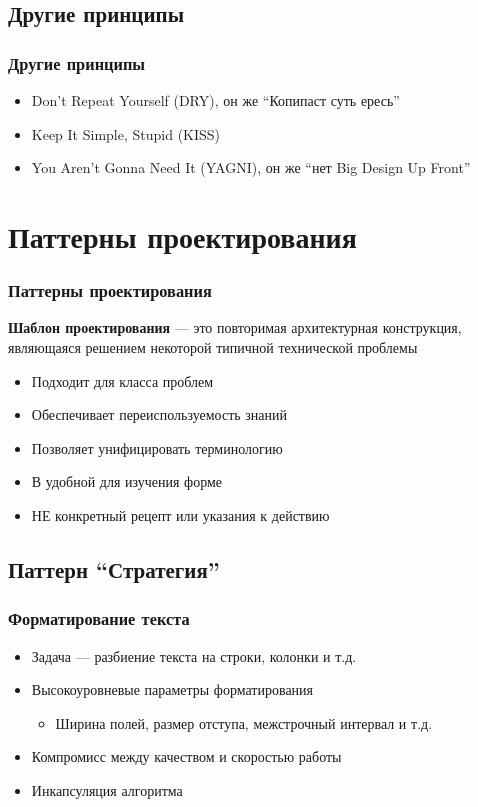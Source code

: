 \documentclass{../../slides-style}
\begin{document}
    \subsection{Другие принципы}

    \begin{frame}
        \frametitle{Другие принципы}
        \begin{itemize}
            \item Don't Repeat Yourself (DRY), он же \enquote{Копипаст суть ересь}
            \item Keep It Simple, Stupid (KISS)
            \item You Aren't Gonna Need It (YAGNI), он же \enquote{нет Big Design Up Front}
        \end{itemize}
    \end{frame}

    \section{Паттерны проектирования}

    \begin{frame}
        \frametitle{Паттерны проектирования}
        \textbf{Шаблон проектирования} --- это повторимая архитектурная конструкция, являющаяся решением некоторой типичной технической проблемы
        \begin{itemize}
            \item Подходит для класса проблем
            \item Обеспечивает переиспользуемость знаний
            \item Позволяет унифицировать терминологию
            \item В удобной для изучения форме
            \item НЕ конкретный рецепт или указания к действию
        \end{itemize}
    \end{frame}

    \subsection{Паттерн \enquote{Стратегия}}

    \begin{frame}
        \frametitle{Форматирование текста}
        \begin{itemize}
            \item Задача --- разбиение текста на строки, колонки и т.д.
            \item Высокоуровневые параметры форматирования
            \begin{itemize}
                \item Ширина полей, размер отступа, межстрочный интервал и т.д.
            \end{itemize}
            \item Компромисс между качеством и скоростью работы
            \item Инкапсуляция алгоритма
        \end{itemize}
    \end{frame}
\end{document}

